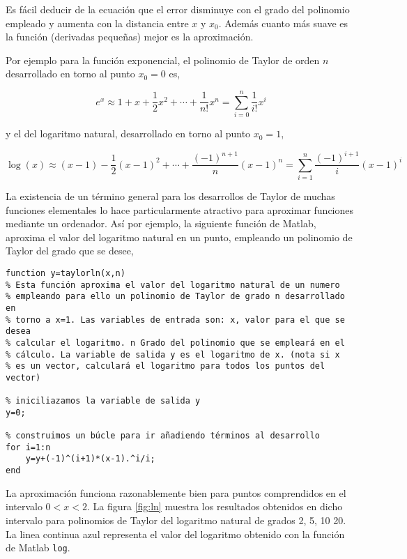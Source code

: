 Es fácil deducir de la ecuación que el error disminuye con el grado del polinomio empleado y aumenta con la distancia entre $x$ y $x_0$. Además cuanto más suave es la función (derivadas pequeñas) mejor es la aproximación.

Por ejemplo para la función exponencial, el polinomio de Taylor de orden $n$ desarrollado en torno al punto $x_0=0$ es, 

\begin{equation*}
e^x\approx 1+x+\frac{1}{2}x^2+\cdots+\frac{1}{n!}x^n=\sum_{i=0}^n\frac{1}{i!}x^i
\end{equation*}

y el del logaritmo natural, desarrollado en torno al punto $x_0=1$, 

\begin{equation*}
\log(x)\approx (x-1)-\frac{1}{2}(x-1)^2+\cdots+\frac{(-1)^{n+1}}{n}(x-1)^n=\sum_{i=1}^n\frac{(-1)^{i+1}}{i}(x-1)^i
\end{equation*}

La existencia de un término general para los desarrollos de Taylor de muchas funciones elementales lo hace particularmente atractivo para aproximar funciones mediante un ordenador. Así por ejemplo, la siguiente función de Matlab, aproxima el valor del logaritmo natural en un punto, empleando un polinomio de Taylor del grado que se desee,

\begin{lstlisting}
function y=taylorln(x,n)
% Esta función aproxima el valor del logaritmo natural de un numero
% empleando para ello un polinomio de Taylor de grado n desarrollado en 
% torno a x=1. Las variables de entrada son: x, valor para el que se desea 
% calcular el logaritmo. n Grado del polinomio que se empleará en el 
% cálculo. La variable de salida y es el logaritmo de x. (nota si x
% es un vector, calculará el logaritmo para todos los puntos del vector)

% iniciliazamos la variable de salida y
y=0;

% construimos un búcle para ir añadiendo términos al desarrollo
for i=1:n
    y=y+(-1)^(i+1)*(x-1).^i/i;
end
\end{lstlisting}

La aproximación funciona razonablemente bien para puntos comprendidos en el intervalo $0<x<2$. La figura \ref{fig:ln} muestra los resultados obtenidos en dicho intervalo para polinomios de Taylor del logaritmo natural de grados 2, 5, 10 20. La linea continua azul representa el valor del logaritmo obtenido con la función de Matlab \texttt{log}.

